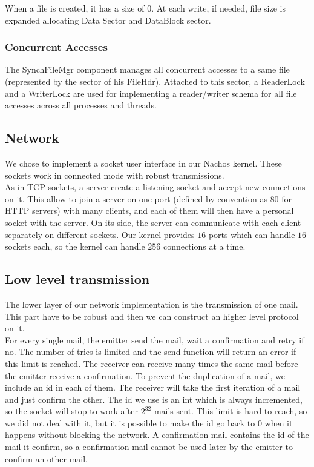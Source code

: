 When a file is created, it has a size of $0$. At each write, if needed, file size is
expanded allocating Data Sector and DataBlock sector.

\subsubsection{Concurrent Accesses}
The SynchFileMgr component manages all concurrent accesses to a same file
(represented by the sector of his FileHdr). Attached to this sector, a
ReaderLock and a WriterLock are used for implementing a reader/writer schema for
all file accesses across all processes and threads.

\subsection{Network}
We chose to implement a socket user interface in our Nachos kernel. These
sockets work in connected mode with robust transmissions.\\
As in TCP sockets, a server create a listening socket and accept new
connections on it. This allow to join a server on one port (defined by
convention as $80$ for HTTP servers) with many clients, and each of them will then
have a personal socket with the server.
On its side, the server can communicate with each client separately on
different sockets. Our kernel provides $16$ ports which can handle $16$ sockets
each, so the kernel can handle $256$ connections at a time.

\subsection{Low level transmission}
The lower layer of our network implementation is the transmission of one mail.
This part have to be robust and then we can construct an higher level protocol
on it.\\
For every single mail, the emitter send the mail, wait a confirmation and retry
if no. The number of tries is limited and the send function will return an
error if this limit is reached.
The receiver can receive many times the same mail before the emitter receive a
confirmation. To prevent the duplication of a mail, we include an id in each of
them. The receiver will take the first iteration of a mail and just confirm the
other. The id we use is an int which is always incremented, so the socket will stop
to work after $2^{32}$ mails sent. This limit is hard to reach, so we did not
deal with it, but it is possible to make the id go back to $0$ when it happens
without blocking the network.
A confirmation mail contains the id of the mail it confirm, so a confirmation
mail cannot be used later by the emitter to confirm an other mail.

